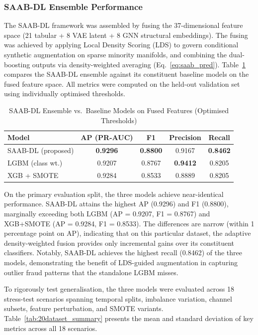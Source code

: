 \documentclass[a4paper,fleqn]{cas-sc}
\begin{document}
\subsubsection{SAAB-DL Ensemble Performance}
The SAAB-DL framework was assembled by fusing the 37-dimensional feature space (21 tabular + 8 VAE latent + 8 GNN structural embeddings). The fusing was achieved by applying Local Density Scoring (LDS) to govern conditional synthetic augmentation on sparse minority manifolds, and combining the dual-boosting outputs via density-weighted averaging (Eq.~\ref{eq:saab_pred}). Table~\ref{tab:saab_vs_baselines} compares the SAAB-DL ensemble against its constituent baseline models on the fused feature space.  All metrics were computed on the held-out validation set using individually optimised thresholds.

\begin{table}[H]
\centering
\caption{SAAB-DL Ensemble vs.\ Baseline Models on Fused Features (Optimised Thresholds)}
\label{tab:saab_vs_baselines}
\small
\begin{tabular}{@{}lcccc@{}}
\toprule
\textbf{Model} & \textbf{AP (PR-AUC)} & \textbf{F1} & \textbf{Precision} & \textbf{Recall} \\
\midrule
SAAB-DL (proposed) & \textbf{0.9296} & \textbf{0.8800} & 0.9167 & \textbf{0.8462} \\
LGBM (class wt.)   & 0.9207 & 0.8767 & \textbf{0.9412} & 0.8205 \\
XGB + SMOTE        & 0.9284 & 0.8533 & 0.8889 & 0.8205 \\
\bottomrule
\end{tabular}
\end{table}

On the primary evaluation split, the three models achieve near-identical performance. SAAB-DL attains the highest AP (0.9296) and F1 (0.8800), marginally exceeding both LGBM (AP = 0.9207, F1 = 0.8767) and XGB+SMOTE (AP = 0.9284, F1 = 0.8533). The differences are narrow (within 1 percentage point on AP), indicating that on this particular dataset, the adaptive density-weighted fusion provides only incremental gains over its constituent classifiers. Notably, SAAB-DL achieves the highest recall (0.8462) of the three models, demonstrating the benefit of LDS-guided augmentation in capturing outlier fraud patterns that the standalone LGBM misses.

To rigorously test generalisation, the three models were evaluated across 18 stress-test scenarios spanning temporal splits, imbalance variation, channel subsets, feature perturbation, and SMOTE variants. Table~\ref{tab:20dataset_summary} presents the mean and standard deviation of key metrics across all 18 scenarios.
\end{document}
